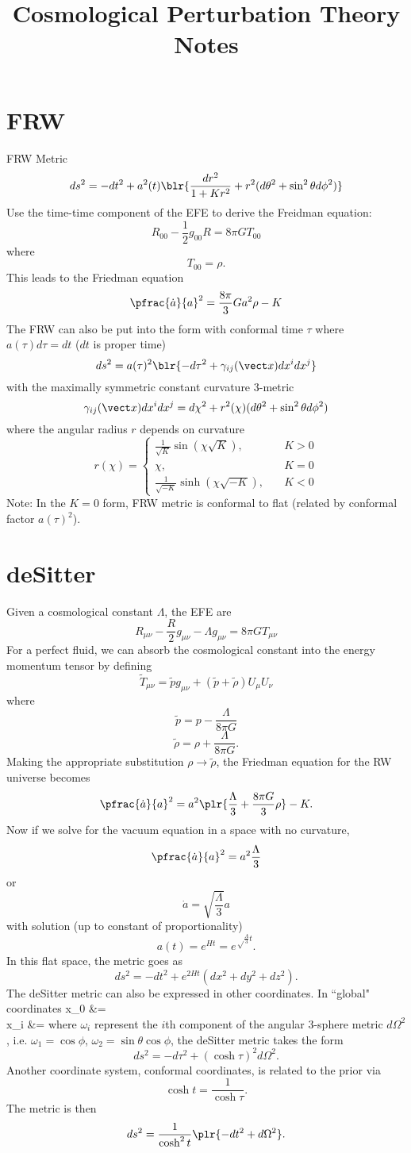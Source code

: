 \documentclass[10pt,letterpaper]{article}
\title{Cosmological Perturbation Theory Notes}
\author{}
\date{}
\begin{document}
\maketitle
\section*{FRW}

FRW Metric
\[
	ds^2 = -dt^2+a^2(t)\blr{ \frac{dr^2}{1+Kr^2}+r^2(d\theta^2+\sin^2\theta d\phi^2)}
\]	
Use the time-time component of the EFE to derive the Freidman equation:
\[
	R_{00} -\frac{1}{2} g_{00}R = 8\pi G T_{00}
\]
where
\[
	T_{00} = \rho.
\]
This leads to the Friedman equation 
\[
	\pfrac{\dot a}{a}^2 = \frac{8\pi}{3}G a^2\rho - K
\]
The FRW can also be put into the form with conformal time $\tau$ where $a(\tau)d\tau = dt$ ($dt$ is proper time)
\[
	ds^2 = a(\tau)^2\blr{ -d\tau^2 +\gamma_{ij}(\vect x)dx^i dx^j}
\]
with the maximally symmetric constant curvature 3-metric 
\[
	\gamma_{ij}(\vect x)dx^idx^j =  d\chi^2 +r^2(\chi)(d\theta^2+\sin^2\theta d\phi^2)
\]
where the angular radius $r$ depends on curvature
\[
	r(\chi) = \begin{cases} 
	\frac{1}{\sqrt K}\sin(\chi\sqrt K),&\quad K>0 \\
	\chi,&\quad K=0\\
	\frac{1}{\sqrt{-K}}\sinh(\chi\sqrt{-K}),&\quad K<0
	\end{cases}
\]
Note: In the $K=0$ form, FRW metric is conformal to flat (related by conformal factor $a(\tau)^2$).
\newpage 
\section*{deSitter}
Given a cosmological constant $\Lambda$, the EFE are
\[
	R_{\mu\nu}-\frac{R}{2} g_{\mu\nu}-\Lambda g_{\mu\nu} = 8\pi G T_{\mu\nu}
\]
For a perfect fluid, we can absorb the cosmological constant into the energy momentum tensor by defining
\[
	\tilde T_{\mu\nu} = \tilde pg_{\mu\nu} +(\tilde p+\tilde \rho)U_\mu U_\nu
\]
where
\[	
	\tilde p = p-\frac{\Lambda}{8\pi G}
\]
\[
	\tilde \rho = \rho+\frac{\Lambda}{8\pi G}.
\]
Making the appropriate substitution $\rho \to \tilde\rho$, the Friedman equation for the RW universe becomes 
\[
	\pfrac{\dot a}{a}^2 = a^2\plr{ \frac{\Lambda}{3}+\frac{8\pi G}{3}\rho} - K.
\]
Now if we solve for the vacuum equation in a space with no curvature,
\[
	\pfrac{\dot a}{a}^2 =  a^2\frac{\Lambda}{3}
\]
or
\[
	\dot a = \sqrt{\frac{\Lambda}{3}}a
\]
with solution (up to constant of proportionality)
\[
	a(t) = e^{Ht} = e^{\sqrt\frac{\Lambda}{3}t}.
\]
In this flat space, the metric goes as
\[
	ds^2 = -dt^2 + e^{2Ht}(dx^2+dy^2+dz^2).
\]
The deSitter metric can also be expressed in other coordinates. In ``global" coordinates
\ba
	x_0 &= \\
	x_i &= 
\ea
where $\omega_i$ represent the $i$th component of the angular 3-sphere metric $d\Omega^2$, i.e. 
$\omega_1 = \cos\phi$, $\omega_2 = \sin\theta\cos\phi$, the deSitter metric takes the form
\[
	ds^2 = -d\tau^2+(\cosh \tau)^2d\Omega^2.
\]
Another coordinate system, conformal coordinates, is related to the prior via
\[
	\cosh t = \frac{1}{\cosh \tau}.
\]
The metric is then
\[
	ds^2 = \frac{1}{\cosh^2 t}\plr{-dt^2+d\Omega^2}.
\]
\newpage
\end{document}
